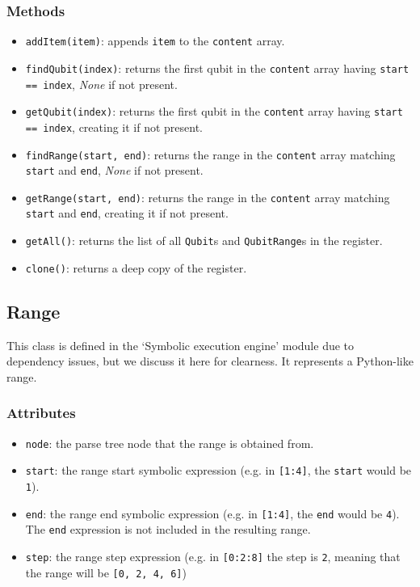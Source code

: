 \documentclass[12pt,a4paper]{report}
\theoremstyle{definition}
\theoremstyle{definition}
\theoremstyle{definition}
\begin{document}
\subsubsection{Methods}
\begin{itemize}
    \itemsep 0em
    \item \texttt{addItem(item)}: appends \texttt{item} to the \texttt{content} array.
    \item \texttt{findQubit(index)}: returns the first qubit in the \texttt{content} array having \texttt{start == index}, \textit{None} if not present.
    \item \texttt{getQubit(index)}: returns the first qubit in the \texttt{content} array having \texttt{start == index}, creating it if not present.
    \item \texttt{findRange(start, end)}: returns the range in the \texttt{content} array matching \texttt{start} and \texttt{end}, \textit{None} if not present.
    \item \texttt{getRange(start, end)}: returns the range in the \texttt{content} array matching \texttt{start} and \texttt{end}, creating it if not present.
    \item \texttt{getAll()}: returns the list of all \texttt{Qubit}s and \texttt{QubitRange}s in the register.
    \item \texttt{clone()}: returns a deep copy of the register.
\end{itemize}

\subsection{Range}
This class is defined in the `Symbolic execution engine' module due to dependency issues, but we discuss it here for clearness. It represents a Python-like range.
\subsubsection{Attributes}
\begin{itemize}
    \itemsep 0em
    \item \texttt{node}: the parse tree node that the range is obtained from.
    \item \texttt{start}: the range start symbolic expression (e.g. in \texttt{[1:4]}, the \texttt{start} would be \texttt{1}).
    \item \texttt{end}: the range end symbolic expression (e.g. in \texttt{[1:4]}, the \texttt{end} would be \texttt{4}). The \texttt{end} expression is not included in the resulting range.
    \item \texttt{step}: the range step expression (e.g. in \texttt{[0:2:8]} the step is \texttt{2}, meaning that the range will be \texttt{[0, 2, 4, 6]})
\end{itemize}
\end{document}
